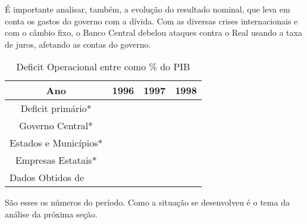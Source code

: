 \documentclass{article}
\begin{document}
É importante analisar, também, a evolução do resultado nominal, que leva em conta os gastos do governo com a dívida. Com as diversas crises internacionais e com o câmbio fixo, o Banco Central debelou ataques contra o Real usando a taxa de juros, afetando as contas do governo. %

\begin{table}[h]
\begin{center}
\begin{tabular}[c]{|c|c|c|c|}
\hline
\textbf{Ano} & \textbf{1996} & \textbf{1997} & \textbf{1998}\\ \hline
Deficit primário* &  &  &  \\ \hline
Governo Central* &  &  & \\ \hline
Estados e Municípios* &  &  &  \\ \hline
Empresas Estatais* &  &  &  \\ \hline
\multicolumn{4}{l}{Dados Obtidos de \citet{Giambiagi2002}} \\
\end{tabular}
\caption{Deficit Operacional entre como \% do PIB}
\end{center}
\end{table}

São esses os números do período. Como a situação se desenvolveu é o tema da análise da próxima seção. 


\end{document}
